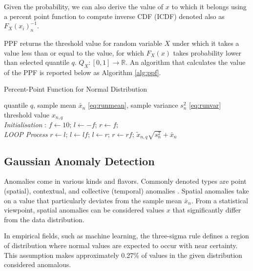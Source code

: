 Given the probability, we can also derive the value of \(x\) to which it belongs using a percent point function to compute inverse CDF (ICDF) denoted also as $F_X(x_i)^{-1}_n$.

\begin{definition}
PPF returns the threshold value for random variable \(X\) under which it takes a value less than or equal to the value, for which \(F_X(x)\) takes probability lower than selected quantile \(q\). \(Q_X\colon [0, 1] \to \mathbb{R}\). An algorithm that calculates the value of the PPF is reported below as Algorithm \ref{alg:ppf}.
\end{definition}

\begin{algorithm}[H]
\caption{{Percent-Point Function for Normal Distribution}} \label{alg:ppf}
 \begin{algorithmic}[1]
 \renewcommand{\algorithmicrequire}{\textbf{Input:}}
 \renewcommand{\algorithmicensure}{\textbf{Output:}}
 \REQUIRE quantile $q$, sample mean $\bar x_n$ \eqref{eq:runmean}, sample variance $s^2_n$ \eqref{eq:runvar}
 \ENSURE  threshold value $x_{n,q}$
 \\ \textit{Initialisation} : 
  \STATE $f \leftarrow 10$; $l \leftarrow -f $; $r \leftarrow f;$
 \\ \textit{LOOP Process}
  \STATE $r \leftarrow l $;
  \STATE $l \leftarrow lf $;
  \ENDWHILE
    \STATE $l \leftarrow r $;
    \STATE $r \leftarrow rf $;
  \ENDWHILE
 \RETURN $\tilde{x}_{n,q}  \sqrt{s^2_n} + \bar x_n $
 \end{algorithmic}
\end{algorithm}


\subsection{Gaussian Anomaly Detection}\label{AA:Anomaly}
Anomalies come in various kinds and flavors. Commonly denoted types are point (spatial), contextual, and collective (temporal) anomalies \cite{Chandola2009}.
Spatial anomalies take on a value that particularly deviates from the sample mean \(\bar x_n\). From a statistical viewpoint, spatial anomalies can be considered values \(x\) that significantly differ from the data distribution. 

In empirical fields, such as machine learning, the three-sigma rule defines a region of distribution where normal values are expected to occur with near certainty. This assumption makes approximately 0.27\% of values in the given distribution considered anomalous. 

